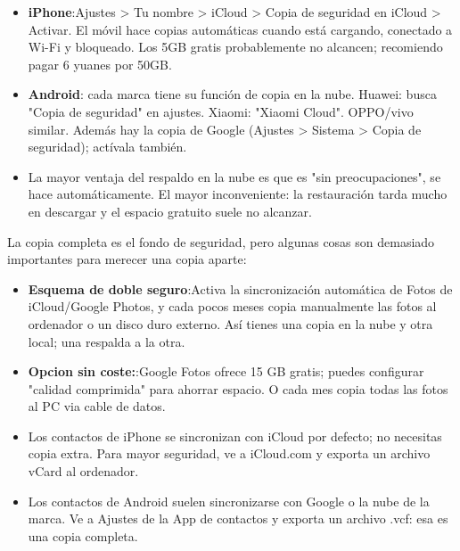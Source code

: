 
\begin{itemize}
  \item \textbf{iPhone}:Ajustes > Tu nombre > iCloud > Copia de seguridad en iCloud > Activar. El móvil hace copias automáticas cuando está cargando, conectado a Wi-Fi y bloqueado. Los 5GB gratis probablemente no alcancen; recomiendo pagar 6 yuanes por 50GB.
  \item \textbf{Android}: cada marca tiene su función de copia en la nube. Huawei: busca "Copia de seguridad" en ajustes. Xiaomi: "Xiaomi Cloud". OPPO/vivo similar. Además hay la copia de Google (Ajustes > Sistema > Copia de seguridad); actívala también.
  \item La mayor ventaja del respaldo en la nube es que es "sin preocupaciones", se hace automáticamente. El mayor inconveniente: la restauración tarda mucho en descargar y el espacio gratuito suele no alcanzar.
\end{itemize}


La copia completa es el fondo de seguridad, pero algunas cosas son demasiado importantes para merecer una copia aparte:


\begin{itemize}
  \item \textbf{Esquema de doble seguro}:Activa la sincronización automática de Fotos de iCloud/Google Photos, y cada pocos meses copia manualmente las fotos al ordenador o un disco duro externo. Así tienes una copia en la nube y otra local; una respalda a la otra.
  \item \textbf{Opcion sin coste:}:Google Fotos ofrece 15 GB gratis; puedes configurar "calidad comprimida" para ahorrar espacio. O cada mes copia todas las fotos al PC via cable de datos.
\end{itemize}


\begin{itemize}
  \item Los contactos de iPhone se sincronizan con iCloud por defecto; no necesitas copia extra. Para mayor seguridad, ve a iCloud.com y exporta un archivo vCard al ordenador.
  \item Los contactos de Android suelen sincronizarse con Google o la nube de la marca. Ve a Ajustes de la App de contactos y exporta un archivo .vcf: esa es una copia completa.
\end{itemize}


